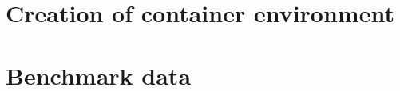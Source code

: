 \documentclass{bachproef-tin}
\begin{document}
\chapter{Creation of container environment}

\chapter{Benchmark data}


\printbibliography[heading=bibintoc]
\end{document}
